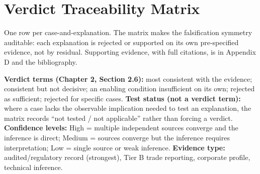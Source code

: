 \hypertarget{verdict-traceability-matrix}{%
\chapter{Verdict Traceability
Matrix}\label{verdict-traceability-matrix}}

One row per case-and-explanation. The matrix makes the falsification
symmetry auditable: each explanation is rejected or supported on its own
pre-specified evidence, not by residual. Supporting evidence, with full
citations, is in Appendix D and the bibliography.

\textbf{Verdict terms (Chapter 2, Section 2.6):} most consistent with
the evidence; consistent but not decisive; an enabling condition
insufficient on its own; rejected as sufficient; rejected for specific
cases. \textbf{Test status (not a verdict term):} where a case lacks the
observable implication needed to test an explanation, the matrix records
``not tested / not applicable'' rather than forcing a verdict.
\textbf{Confidence levels:} High = multiple independent sources converge
and the inference is direct; Medium = sources converge but the inference
requires interpretation; Low = single source or weak inference.
\textbf{Evidence type:} audited/regulatory record (strongest), Tier B
trade reporting, corporate profile, technical inference.

